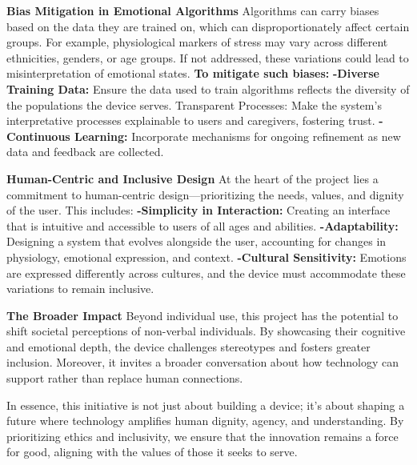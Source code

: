 \documentclass[12pt, research paper]{report}
\begin{document}
	\noindent \textbf{Bias Mitigation in Emotional Algorithms}
	\newline Algorithms can carry biases based on the data they are trained on, which can disproportionately affect certain groups. For example, physiological markers of stress may vary across different ethnicities, genders, or age groups. If not addressed, these variations could lead to misinterpretation of emotional states.
	\newline \textbf{To mitigate such biases:}
	\newline \textbf{-Diverse Training Data:} Ensure the data used to train algorithms reflects the diversity of the populations the device serves.
	Transparent Processes: Make the system’s interpretative processes explainable to users and caregivers, fostering trust.
	\newline \textbf{-Continuous Learning:} Incorporate mechanisms for ongoing refinement as new data and feedback are collected.
	\bigskip 
	
	\noindent \textbf{Human-Centric and Inclusive Design}
	\newline At the heart of the project lies a commitment to human-centric design—prioritizing the needs, values, and dignity of the user. This includes:
	\newline \textbf{-Simplicity in Interaction:} Creating an interface that is intuitive and accessible to users of all ages and abilities.
	\newline \textbf{-Adaptability:} Designing a system that evolves alongside the user, accounting for changes in physiology, emotional expression, and context.
	\newline \textbf{-Cultural Sensitivity:} Emotions are expressed differently across cultures, and the device must accommodate these variations to remain inclusive.
	\bigskip
	
	\noindent \textbf{The Broader Impact}
	\newline Beyond individual use, this project has the potential to shift societal perceptions of non-verbal individuals. By showcasing their cognitive and emotional depth, the device challenges stereotypes and fosters greater inclusion. Moreover, it invites a broader conversation about how technology can support rather than replace human connections.
	\bigskip 
	
	\noindent In essence, this initiative is not just about building a device; it’s about shaping a future where technology amplifies human dignity, agency, and understanding. By prioritizing ethics and inclusivity, we ensure that the innovation remains a force for good, aligning with the values of those it seeks to serve.
	
\end{document}
